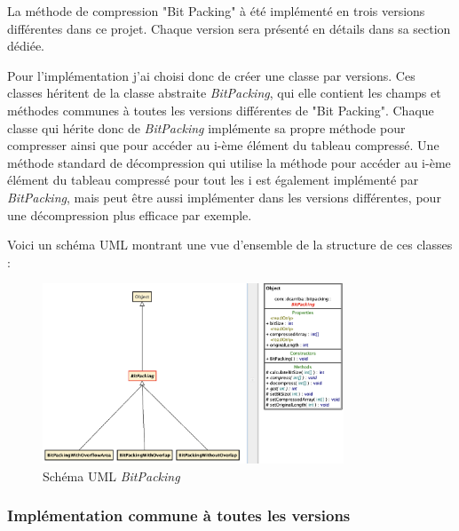 \documentclass[titlepage]{article}
\begin{document}
La méthode de compression "Bit Packing" à été implémenté en trois versions différentes dans ce projet. Chaque version sera présenté en détails dans sa section dédiée.
\par Pour l'implémentation j'ai choisi donc de créer une classe par versions. Ces classes héritent de la classe abstraite \textsl{BitPacking}, qui elle contient les champs et méthodes communes à toutes les versions différentes de "Bit Packing". Chaque classe qui hérite donc de \textsl{BitPacking} implémente sa propre méthode pour compresser ainsi que pour accéder au i-ème élément du tableau compressé. Une méthode standard de décompression qui utilise la méthode pour accéder au i-ème élément du tableau compressé pour tout les i est également implémenté par \textsl{BitPacking}, mais peut être aussi implémenter dans les versions différentes, pour une décompression plus efficace par exemple. 
\par Voici un schéma UML montrant une vue d'ensemble de la structure de ces classes :
\begin{figure}[h!]
    \centering
    \includegraphics[width=0.8\textwidth]{img/BitPackingUML.png}
    \caption{Schéma UML \textsl{BitPacking}}
    \label{fig:BitPackingUML}
\end{figure}



\subsubsection{Implémentation commune à toutes les versions}
\end{document}
